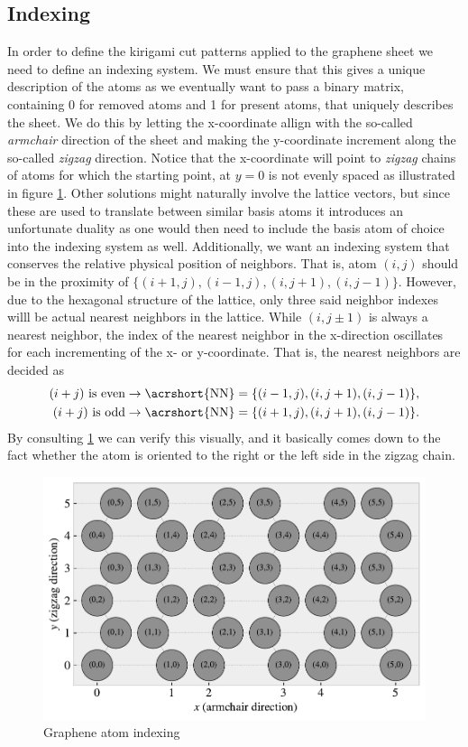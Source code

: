 \subsection{Indexing}
In order to define the kirigami cut patterns applied to the graphene sheet we need to
define an indexing system. We must ensure that this gives a unique description
of the atoms as we eventually want to pass a binary matrix, containing 0 for
removed atoms and 1 for present atoms, that uniquely describes the sheet. We do
this by letting the x-coordinate allign with the so-called \textit{armchair} direction of the sheet and making the y-coordinate increment along the
so-called \textit{zigzag} direction. Notice that the x-coordinate will point
to \textit{zigzag} chains of atoms for which the starting point, at $y = 0$ is not evenly spaced as illustrated in figure \cref{fig:atom_indexing}. Other solutions
might naturally involve the lattice vectors, but since these are used to
translate between similar basis atoms it introduces an unfortunate duality as
one would then need to include the basis atom of choice into the indexing system
as well. Additionally, we want an indexing system that conserves the relative
physical position of neighbors. That is, atom $(i, j)$ should be in the
proximity of $\{(i+1, j), (i-1, j), (i, j+1), (i, j-1)\}$. However, due to the hexagonal structure of the lattice, only three said neighbor indexes willl be actual nearest neighbors in the lattice. While $(i, j\pm 1)$ is always a nearest neighbor, the index of the nearest neighbor in the x-direction oscillates for each incrementing of the x- or y-coordinate. That is, the nearest neighbors are decided as
\begin{equation}
  \begin{aligned}
    (i + j) \ \text{is even} &\rightarrow \text{\acrshort{NN}} = \{(i-1, j), (i, j+1), (i, j-1)\}, \\
    (i + j) \ \text{is odd} &\rightarrow \text{\acrshort{NN}} = \{(i+1, j), (i, j+1), (i, j-1)\}.
  \end{aligned}
  \label{eq:atom_neigh_idx}
\end{equation}
By consulting \cref{fig:atom_indexing} we can verify this visually, and it basically comes down to the fact whether the atom is oriented to the right or the left side in the zigzag chain.

\begin{figure}[H]
  \centering
  \includegraphics[width=0.7\linewidth]{figures/system/atom_indexing.pdf}
  \caption{Graphene atom indexing}
  \label{fig:atom_indexing}
\end{figure}



